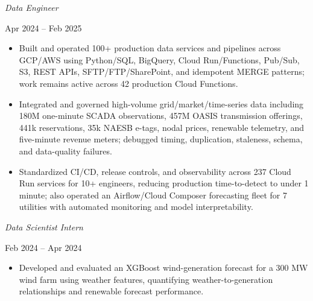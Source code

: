 \documentclass{article}
\newcommand{\when}[1]{\hfill{\color{muted}#1\par}}
\begin{document}
\textit{Data Engineer}\when{Apr 2024 -- Feb 2025}
\begin{itemize}
  \item Built and operated 100+ production data services and pipelines across GCP/AWS using Python/SQL, BigQuery, Cloud Run/Functions, Pub/Sub, S3, REST APIs, SFTP/FTP/SharePoint, and idempotent MERGE patterns; work remains active across 42 production Cloud Functions.
  \item Integrated and governed high-volume grid/market/time-series data including 180M one-minute SCADA observations, 457M OASIS transmission offerings, 441k reservations, 35k NAESB e-tags, nodal prices, renewable telemetry, and five-minute revenue meters; debugged timing, duplication, staleness, schema, and data-quality failures.
  \item Standardized CI/CD, release controls, and observability across 237 Cloud Run services for 10+ engineers, reducing production time-to-detect to under 1 minute; also operated an Airflow/Cloud Composer forecasting fleet for 7 utilities with automated monitoring and model interpretability.
\end{itemize}
\textit{Data Scientist Intern}\when{Feb 2024 -- Apr 2024}
\begin{itemize}
  \item Developed and evaluated an XGBoost wind-generation forecast for a 300 MW wind farm using weather features, quantifying weather-to-generation relationships and renewable forecast performance.
\end{itemize}
\end{document}
